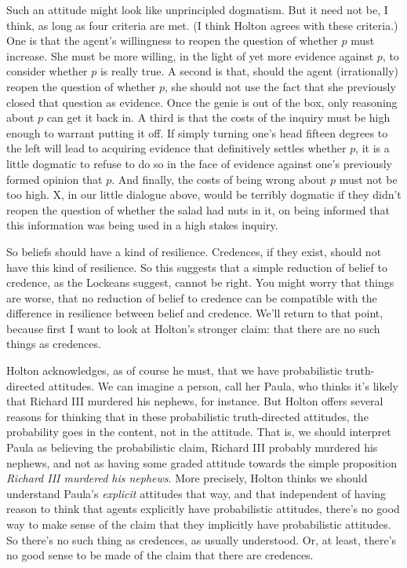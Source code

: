 Such an attitude might look like unprincipled dogmatism. But it need not be, I think, as long as four criteria are met. (I think Holton agrees with these criteria.) One is that the agent's willingness to reopen the question of whether $p$ must increase. She must be more willing, in the light of yet more evidence against $p$, to consider whether $p$ is really true. A second is that, should the agent (irrationally) reopen the question of whether $p$, she should not use the fact that she previously closed that question as evidence. Once the genie is out of the box, only reasoning about $p$ can get it back in. A third is that the costs of the inquiry must be high enough to warrant putting it off. If simply turning one's head fifteen degrees to the left will lead to acquiring evidence that definitively settles whether $p$, it is a little dogmatic to refuse to do so in the face of evidence against one's previously formed opinion that $p$. And finally, the costs of being wrong about $p$ must not be too high. X, in our little dialogue above, would be terribly dogmatic if they didn't reopen the question of whether the salad had nuts in it, on being informed that this information was being used in a high stakes inquiry.

So beliefs should have a kind of resilience. Credences, if they exist, should not have this kind of resilience. So this suggests  that a simple reduction of belief to credence, as the Lockeans suggest, cannot be right. You might worry that things are worse, that no reduction of belief to credence can be compatible with the difference in resilience between belief and credence. We'll return to that point, because first I want to look at Holton's stronger claim: that there are no such things as credences.

Holton acknowledges, as of course he must, that we have probabilistic truth-directed attitudes. We can imagine a person, call her Paula, who thinks it's likely that Richard III murdered his nephews, for instance. But Holton offers several reasons for thinking that in these probabilistic truth-directed attitudes, the probability goes in the content, not in the attitude. That is, we should interpret Paula as believing the probabilistic claim, Richard III probably murdered his nephews, and not as having some graded attitude towards the simple proposition \textit{Richard III murdered his nephews}. More precisely, Holton thinks we should understand Paula's \textit{explicit} attitudes that way, and that independent of having reason to think that agents explicitly have probabilistic attitudes, there's no good way to make sense of the claim that they implicitly have probabilistic attitudes. So there's no such thing as credences, as usually understood. Or, at least, there's no good sense to be made of the claim that there are credences.

